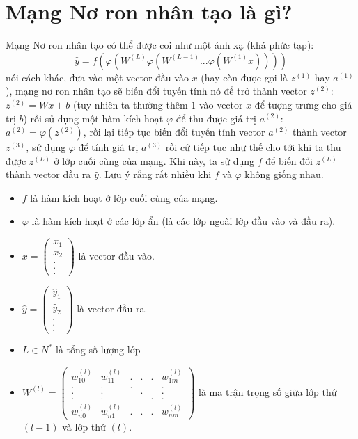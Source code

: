 \documentclass{article}
\begin{document}
\section{Mạng Nơ ron nhân tạo là gì?}
Mạng Nơ ron nhân tạo có thể được coi như một ánh xạ (khá phức tạp): 
\[\hat{y} = f(\varphi({W}^{(L)}\varphi({W}^{(L-1)}...\varphi({W}^{(1)}x))))\]
nói cách khác, đưa vào một vector đầu vào $x$ (hay còn được gọi là $z^{(1)}$ hay $a^{(1)}$), mạng nơ ron nhân tạo sẽ biến đổi tuyến tính nó để trở thành vector $z^{(2)}$: $z^{(2)} = Wx + b$ (tuy nhiên ta thường thêm $1$ vào vector $x$ để tượng trưng cho giá trị $b$) rồi sử dụng một hàm kích hoạt $\varphi$ để thu được giá trị $a^{(2)}$: $a^{(2)} = \varphi{(z^{(2)})}$, rồi lại tiếp tục biến đổi tuyến tính vector $a^{(2)}$ thành vector $z^{(3)}$, sử dụng $\varphi$ để tính giá trị $a^{(3)}$ rồi cứ tiếp tục như thế cho tới khi ta thu được $z^{(L)}$ ở lớp cuối cùng của mạng. Khi này, ta sử dụng $f$ để biến đổi $z^{(L)}$ thành vector đầu ra $\hat{y}$. Lưu ý rằng rất nhiều khi $f$ và $\varphi$ không giống nhau.
\begin{itemize}
    \item $f$ là hàm kích hoạt ở lớp cuối cùng của mạng.
    \item $\varphi$ là hàm kích hoạt ở các lớp ẩn (là các lớp ngoài lớp đầu vào và đầu ra).  
    \item $x = \begin{pmatrix}x_1\\x_2\\.\\.\\. \end{pmatrix}$ là vector đầu vào.

    \item $\hat{y} = \begin{pmatrix}\hat{y}_1\\\hat{y}_2\\.\\.\\. \end{pmatrix}$ là vector đầu ra.
    \item $L \in N^*$ là tổng số lượng lớp
    \item ${W}^{(l)} = \begin{pmatrix}w^{(l)}_{10}&w^{(l)}_{11}&.&.&.&w^{(l)}_{1m}\\.&.&.&&&.\\.&.&&.&&.\\.&.&&&.&.\\w^{(l)}_{n0}&w^{(l)}_{n1}&.&.&.&w^{(l)}_{nm} \end{pmatrix}$ là ma trận trọng số giữa lớp thứ $(l - 1)$ và lớp thứ $(l)$.
\end{itemize}
\end{document}
